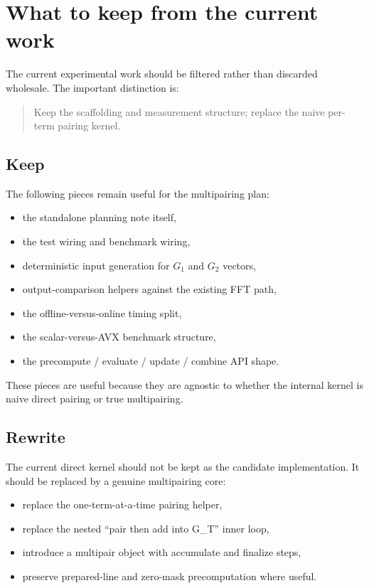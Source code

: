 \documentclass[11pt]{article}
\newcommand{\GT}{G_T}
\begin{document}
\section{What to keep from the current work}

The current experimental work should be filtered rather than discarded
wholesale.
The important distinction is:
\begin{quote}
Keep the scaffolding and measurement structure; replace the naive per-term
pairing kernel.
\end{quote}

\subsection{Keep}

The following pieces remain useful for the multipairing plan:
\begin{itemize}[itemsep=0.3em, topsep=0.4em]
  \item the standalone planning note itself,
  \item the test wiring and benchmark wiring,
  \item deterministic input generation for $G_1$ and $G_2$ vectors,
  \item output-comparison helpers against the existing FFT path,
  \item the offline-versus-online timing split,
  \item the scalar-versus-AVX benchmark structure,
  \item the precompute / evaluate / update / combine API shape.
\end{itemize}

These pieces are useful because they are agnostic to whether the internal
kernel is naive direct pairing or true multipairing.

\subsection{Rewrite}

The current direct kernel should not be kept as the candidate implementation.
It should be replaced by a genuine multipairing core:
\begin{itemize}[itemsep=0.3em, topsep=0.4em]
  \item replace the one-term-at-a-time pairing helper,
  \item replace the nested ``pair then add into \GT'' inner loop,
  \item introduce a multipair object with accumulate and finalize steps,
  \item preserve prepared-line and zero-mask precomputation where useful.
\end{itemize}
\end{document}
